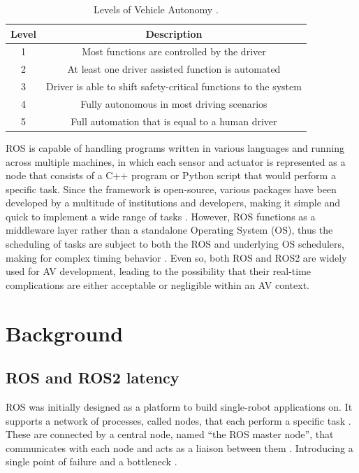 \documentclass[conference,a4paper]{IEEEtran}
\begin{document}
\begin{table}[!t]
	\centering
	\begin{tabular}{|c|c|}
		\toprule
			Level & Description \\
		\midrule
			1 & Most functions are controlled by the driver \\
			2 & At least one driver assisted function is automated \\
			3 & Driver is able to shift \mbox{safety-critical} functions to the system \\
			4 & Fully autonomous in most driving scenarios \\
			5 & Full automation that is equal to a human driver \\
		\bottomrule
	\end{tabular}
	\caption{Levels of Vehicle Autonomy \cite{DoT2016, Wang2018}.}
	\label{tab:autonomy_levels}
\end{table}

\setlength{\parskip}{1em}
\setlength{\parindent}{10pt}
ROS is capable of handling programs written in various languages and running across multiple machines, in which each sensor and actuator is represented as a node that consists of a C++ program or Python script that would perform a specific task. 
Since the framework is \mbox{open-source}, various packages have been developed by a multitude of institutions and developers, making it simple and quick to implement a wide range of tasks \cite{Panayiotou2022}. 
However, ROS functions as a middleware layer rather than a standalone Operating System (OS), thus the scheduling of tasks are subject to both the ROS and underlying OS schedulers, making for complex timing behavior \cite{Casini2019}. 
Even so, both ROS and ROS2 are widely used for AV development, leading to the possibility that their \mbox{real-time} complications are either acceptable or negligible within an AV context.

\setlength{\parskip}{0em}
\setlength{\parindent}{0pt}
\section{Background}

\setlength{\parskip}{0em}
\setlength{\parindent}{0pt}
\subsection{ROS and ROS2 latency}

\setlength{\parskip}{0em}
\setlength{\parindent}{10pt}
ROS was initially designed as a platform to build \mbox{single-robot} applications on. 
It supports a network of processes, called nodes, that each perform a specific task \cite{Quigley2009}. 
These are connected by a central node, named “the ROS master node”, that communicates with each node and acts as a liaison between them \cite{White2019}. 
Introducing a single point of failure and a bottleneck \cite{Macenski2022}.
\end{document}
